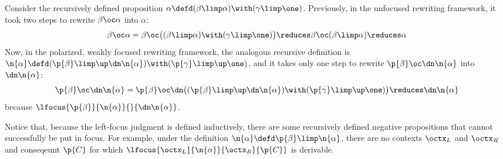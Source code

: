 Consider the recursively defined proposition $\alpha \defd (\beta \limp \alpha) \with (\gamma \limp \one)$.
Previously, in the unfocused rewriting framework, it took two steps to rewrite $\beta \oc \alpha$ into $\alpha$:
\begin{equation*}
  \beta \oc \alpha = \beta \oc \bigl((\beta \limp \alpha) \with (\gamma \limp \one)\bigr)
    \reduces \beta \oc (\beta \limp \alpha)
    \reduces \alpha
\end{equation*}
Now, in the polarized, weakly focused rewriting framework, the analogous recursive definition is $\n{\alpha} \defd (\p{\beta} \limp \up \dn \n{\alpha}) \with (\p{\gamma} \limp \up \one)$, and it takes only one step to rewrite $\p{\beta} \oc \dn \n{\alpha}$ into $\dn \n{\alpha}$:
\begin{equation*}
  \p{\beta} \oc \dn \n{\alpha} = \p{\beta} \oc \dn \bigl((\p{\beta} \limp \up \dn \n{\alpha}) \with (\p{\gamma} \limp \up \one)\bigr)
    \reduces \dn \n{\alpha}
\end{equation*}
because $\lfocus{\p{\beta}}{\n{\alpha}}{}{\dn \n{\alpha}}$.

Notice that, because the left-focus judgment is defined inductively, there are some recursively defined negative propositions that cannot successfully be put in focus.
For example, under the definition $\n{\alpha} \defd \p{\beta} \limp \n{\alpha}$, there are no contexts $\octx_L$ and $\octx_R$ and conseqeunt $\p{C}$ for which $\lfocus{\octx_L}{\n{\alpha}}{\octx_R}{\p{C}}$ is derivable.

